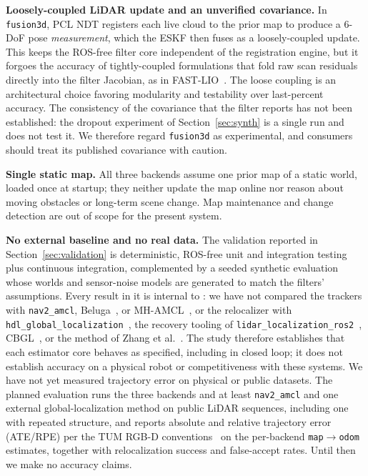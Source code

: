 \textbf{Loosely-coupled LiDAR update and an unverified covariance.} In
\texttt{fusion3d}, PCL NDT
registers each live cloud to the prior map to produce a $6$-DoF pose
\emph{measurement}, which the ESKF then fuses as a loosely-coupled
update. This keeps the ROS-free filter core independent of the
registration engine, but it forgoes the accuracy of tightly-coupled
formulations that fold raw scan residuals directly into the filter
Jacobian, as in FAST-LIO~\cite{xu2021fastlio}. The loose coupling is an
architectural choice favoring modularity and testability over
last-percent accuracy. The consistency of the covariance that the
filter reports has not been established: the dropout experiment of
Section~\ref{sec:synth} is a single run and does not test it. We
therefore regard \texttt{fusion3d} as experimental, and consumers
should treat its published covariance with caution.

\textbf{Single static map.} All three backends assume one prior map of
a static world, loaded once at startup; they neither update the map
online nor reason about moving obstacles or long-term scene change.
Map maintenance and change detection are out of scope for the present
system.

\textbf{No external baseline and no real data.} The validation reported
in Section~\ref{sec:validation} is deterministic, ROS-free unit and
integration testing plus continuous integration, complemented by a
seeded synthetic evaluation whose worlds and sensor-noise models are
generated to match the filters' assumptions. Every result in it is
internal to \prismloc{}: we have not compared the trackers with
\texttt{nav2\_amcl}, Beluga~\cite{puga2024beluga}, or
MH-AMCL~\cite{garcia2023mhamcl}, or the relocalizer with
\texttt{hdl\_global\_localization}~\cite{koide2021hdlgl}, the recovery
tooling of \texttt{lidar\_localization\_ros2}~\cite{sasaki2026globalloc},
CBGL~\cite{filotheou2024cbgl}, or the method of Zhang et
al.~\cite{zhang2026krp}. The study therefore establishes that each
estimator core behaves as specified, including in closed loop; it does
not establish accuracy on a physical robot or competitiveness with
these systems. We have not yet measured trajectory error on physical or
public datasets. The planned evaluation runs the three backends and at
least \texttt{nav2\_amcl} and one external global-localization method
on public LiDAR sequences, including one with repeated structure, and
reports absolute and relative trajectory error (ATE/RPE) per the TUM
RGB-D conventions~\cite{sturm2012benchmark} on the per-backend
\texttt{map}$\to$\texttt{odom} estimates, together with
relocalization success and false-accept rates. Until then we make no
accuracy claims.

